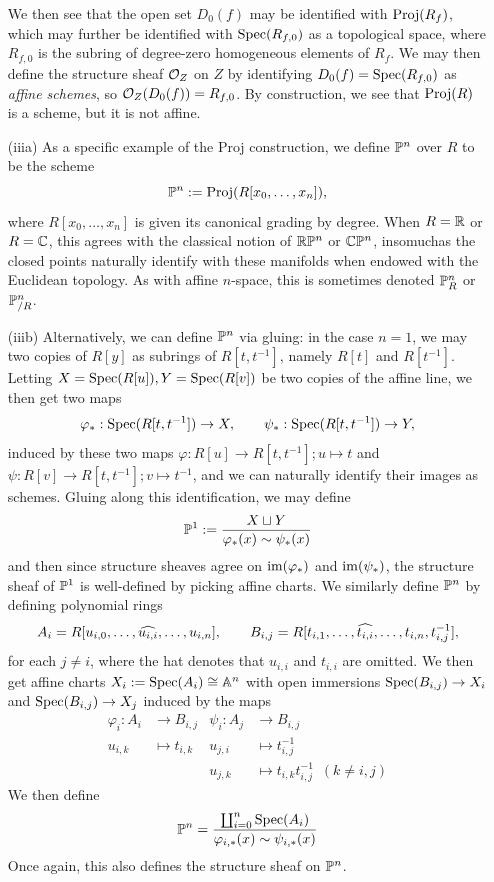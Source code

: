 \begin{eg}
\begin{enumerate}[(i)]
		We then see that the open set $D_0(f)$ may be identified with $\Proj(R_f)$, which may further be identified with $\Spec(R_{f,0})$ as a topological space, where $R_{f,0}$ is the subring of degree-zero homogeneous elements of $R_f$. We may then define the structure sheaf $\ints_Z$ on $Z$ by identifying $D_0(f)=\Spec(R_{f,0})$ as \emph{affine schemes}, so $\ints_Z(D_0(f)) = R_{f,0}$. By construction, we see that $\Proj(R)$ is a scheme, but it is not affine.
		\item[(iiia)] As a specific example of the Proj construction, we define  $\mathbb{P}^n$ over $R$ to be the scheme
			\[
				\mathbb{P}^n := \mathrm{Proj}(R[x_0,\ldots, x_n]),
			\]
			where $R[x_0,\ldots, x_n]$ is given its canonical grading by degree. When $R = \mathbb{R}$ or $R= \mathbb{C}$, this agrees with the classical notion of $\mathbb{R}\mathbb{P}^n$ or $\mathbb{C}\mathbb{P}^n$, insomuchas the closed points naturally identify with these manifolds when endowed with the Euclidean topology. As with affine $n$-space, this is sometimes denoted $\mathbb{P}^n_R$ or $\mathbb{P}^n_{/R}$.
		\item[(iiib)] Alternatively, we can define $\mathbb{P}^n$ via gluing: in the case $n=1$, we may two copies of $R[y]$ as subrings of $R[t, t^{-1}]$, namely $R[t]$ and $R[t^{-1}]$. Letting $X = \mathrm{Spec}(R[u]), Y=\mathrm{Spec}(R[v])$ be two copies of the affine line, we then get two maps
			\[
				\varphi_*: \mathrm{Spec}(R[t,t^{-1}]) \to X,\qquad \psi_*:\mathrm{Spec}(R[t,t^{-1}]) \to Y,
			\]
			induced by these two maps $\varphi: R[u] \to R[t,t^{-1}]; u \mapsto t$ and $\psi: R[v] \to R[t,t^{-1}]; v \mapsto t^{-1}$, and we can naturally identify their images as schemes. Gluing along this identification, we may define
			\[
				\mathbb{P}^1 := \frac{X \sqcup Y}{\varphi_*(x) \sim \psi_*(x)}
			\]
			and then since structure sheaves agree on $\mathrm{im}(\varphi_*)$ and $\mathrm{im}(\psi_*)$, the structure sheaf of $\mathbb{P}^1$ is well-defined by picking affine charts. We similarly define $\mathbb{P}^n$ by defining polynomial rings 
			\[
				A_i = R[u_{i,0}, \ldots, \widehat{u_{i,i}}, \ldots, u_{i,n}],\qquad B_{i,j} = R[t_{i,1}, \ldots, \widehat{t_{i,i}}, \ldots, t_{i,n}, t_{i,j}^{-1}],
			\]
			for each $j \neq i$, where the hat denotes that $u_{i,i}$ and $t_{i,i}$ are omitted. We then get affine charts $X_i := \mathrm{Spec}(A_i) \cong \mathbb{A}^n$ with open immersions $\mathrm{Spec}(B_{i,j}) \to X_i$ and $\mathrm{Spec}(B_{i,j}) \to X_j$ induced by the maps 
			\begin{align*}
				\varphi_i : 	A_i &\to B_{i,j} & \psi_i : A_j &\to B_{i,j}\\
								u_{i,k} &\mapsto t_{i,k} & u_{j,i} &\mapsto t_{i,j}^{-1}\\
										&			 & u_{j,k} &\mapsto t_{i,k} t_{i,j}^{-1}\,\,\,(k\neq i,j)
			\end{align*}
			We then define 
			\[
				\mathbb{P}^n = \frac{\coprod_{i=0}^n \mathrm{Spec}(A_i)}{\varphi_{i,*}(x) \sim \psi_{i, *}(x)}
			\]
			Once again, this also defines the structure sheaf on $\mathbb{P}^n$. \qedhere
	\end{enumerate}
\end{eg}

